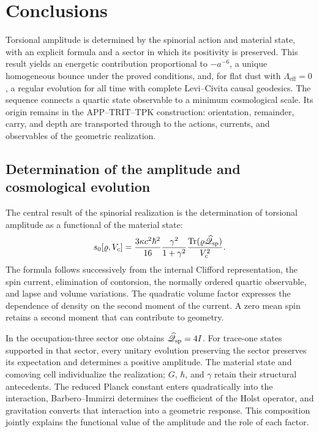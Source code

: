 \section{Conclusions}
\label{vii:sec:conclusiones}

Torsional amplitude is determined by the spinorial action and material
state, with an explicit formula and a sector in which its positivity is
preserved. This result yields an energetic contribution proportional to
\(-a^{-6}\), a unique homogeneous bounce under the proved conditions,
and, for flat dust with \(\Lambda_{\mathrm{eff}}=0\), a regular evolution
for all time with complete Levi--Civita causal geodesics. The sequence
connects a quartic state observable to a minimum cosmological scale. Its
origin remains in the APP--TRIT--TPK construction: orientation,
remainder, carry, and depth are transported through to the actions,
currents, and observables of the geometric realization.

\subsection{Determination of the amplitude and cosmological evolution}

The central result of the spinorial realization is the determination
of torsional amplitude as a functional of the material state:
\[
 s_0[\varrho,V_c]
 =\frac{3\kappa c^2\hbar^2}{16}
   \frac{\gamma^2}{1+\gamma^2}
   \frac{\operatorname{Tr}
    (\varrho\widehat{\mathscr Q}_{\rm sp})}{V_c^2}.
\]
The formula follows successively from the internal Clifford
representation, the spin current, elimination of contorsion,
the normally ordered quartic observable, and lapse and
volume variations. The quadratic volume factor expresses the
dependence of density on the second moment of the
current. A zero mean spin retains a second moment
that can contribute to geometry.

In the occupation-three sector one obtains
\(\widehat{\mathscr Q}_{\rm sp}=4I\). For trace-one states supported
in that sector, every unitary evolution preserving the sector preserves
its expectation and determines a positive amplitude.
The material state and comoving cell individualize the realization;
\(G\), \(\hbar\), and \(\gamma\) retain their structural
antecedents. The reduced Planck constant enters quadratically into
the interaction, Barbero--Immirzi determines the coefficient of
the Holst operator, and gravitation converts that interaction into
a geometric response. This composition jointly explains
the functional value of the amplitude and the role of each factor.

